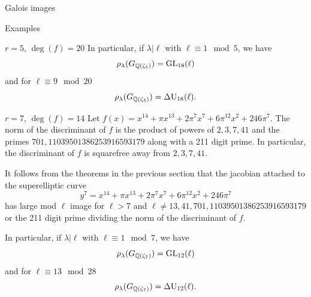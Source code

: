 \documentclass[11pt,a4paper]{article}
\newcommand{\Gcyclo}[1]{G_{\QQ(\zeta_{#1})}}
\begin{document}
\begin{section}{Galois images}
\begin{subsection}{Examples}
\begin{subsubsection}{$r=5$, $\deg(f) = 20$}
In particular, if $\lambda|\ell$ with $\ell \equiv 1 \mod{5}$, we have \[\rho_\lambda(\Gcyclo{5})=\GL_{18}(\ell)\]
and for $\ell \equiv 9 \mod{20}$
\[\rho_\lambda(\Gcyclo{5})=\DU_{18}(\ell).\]
\end{subsubsection}
\begin{subsubsection}{$r=7$, $\deg(f) = 14$}
Let $f(x) = x^{14}+ \pi x^{13} + 2\pi^7 x^7 + 6\pi^{12}x^2 + 246\pi^7$. The norm of the discriminant of $f$ is the product of powers of $2,3,7,41$ and the primes $701, 11039501386253916593179$ along with a 211 digit prime. In particular, the discriminant of $f$ is squarefree away from $2,3,7,41$.

It follows from the theorems in the previous section that the jacobian attached to the superelliptic curve
\[ y^7 = x^{14} + \pi x^{13} + 2\pi^7 x^7 + 6\pi^{12} x^2 + 246\pi^7
\]
has large mod $\ell$ image for $\ell > 7$ and $\ell \neq 13, 41, 701, 11039501386253916593179$ or the 211 digit prime dividing the norm of the discriminant of $f$.

In particular, if $\lambda|\ell$ with $\ell \equiv 1 \mod{7}$, we have \[\rho_\lambda(\Gcyclo{7})=\GL_{12}(\ell)\]
and for $\ell \equiv 13 \mod{28}$
\[\rho_\lambda(\Gcyclo{7})=\DU_{12}(\ell).\]
\end{subsubsection}
\end{subsection}

\end{section}





\end{document}
